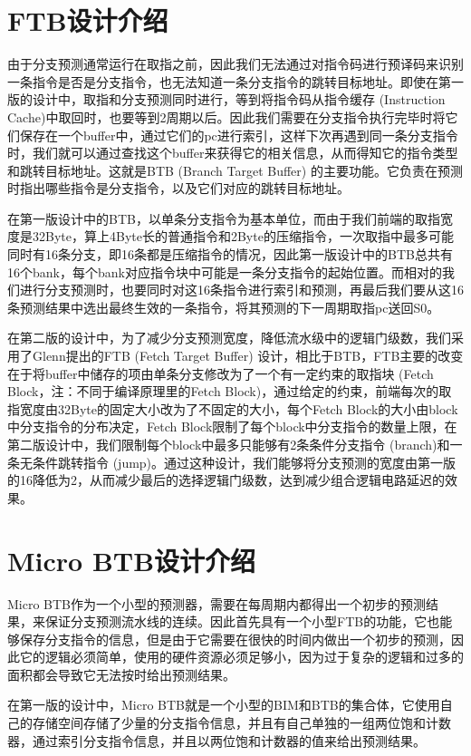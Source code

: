 \section{FTB设计介绍}

由于分支预测通常运行在取指之前，因此我们无法通过对指令码进行预译码来识别一条指令是否是分支指令，也无法知道一条分支指令的跳转目标地址。即使在第一版的设计中，取指和分支预测同时进行，等到将指令码从指令缓存 (Instruction Cache)中取回时，也要等到2周期以后。因此我们需要在分支指令执行完毕时将它们保存在一个buffer中，通过它们的pc进行索引，这样下次再遇到同一条分支指令时，我们就可以通过查找这个buffer来获得它的相关信息，从而得知它的指令类型和跳转目标地址。这就是BTB (Branch Target Buffer) 的主要功能。它负责在预测时指出哪些指令是分支指令，以及它们对应的跳转目标地址。

在第一版设计中的BTB，以单条分支指令为基本单位，而由于我们前端的取指宽度是32Byte，算上4Byte长的普通指令和2Byte的压缩指令，一次取指中最多可能同时有16条分支，即16条都是压缩指令的情况，因此第一版设计中的BTB总共有16个bank，每个bank对应指令块中可能是一条分支指令的起始位置。而相对的我们进行分支预测时，也要同时对这16条指令进行索引和预测，再最后我们要从这16条预测结果中选出最终生效的一条指令，将其预测的下一周期取指pc送回S0。

在第二版的设计中，为了减少分支预测宽度，降低流水级中的逻辑门级数，我们采用了Glenn提出的FTB (Fetch Target Buffer) 设计\cite{scalable-frontend}，相比于BTB，FTB主要的改变在于将buffer中储存的项由单条分支修改为了一个有一定约束的取指块 (Fetch Block，注：不同于编译原理里的Fetch Block)，通过给定的约束，前端每次的取指宽度由32Byte的固定大小改为了不固定的大小，每个Fetch Block的大小由block中分支指令的分布决定，Fetch Block限制了每个block中分支指令的数量上限，在第二版设计中，我们限制每个block中最多只能够有2条条件分支指令 (branch)和一条无条件跳转指令 (jump)。通过这种设计，我们能够将分支预测的宽度由第一版的16降低为2，从而减少最后的选择逻辑门级数，达到减少组合逻辑电路延迟的效果。

\section{Micro BTB设计介绍}

Micro BTB作为一个小型的预测器，需要在每周期内都得出一个初步的预测结果，来保证分支预测流水线的连续。因此首先具有一个小型FTB的功能，它也能够保存分支指令的信息，但是由于它需要在很快的时间内做出一个初步的预测，因此它的逻辑必须简单，使用的硬件资源必须足够小，因为过于复杂的逻辑和过多的面积都会导致它无法按时给出预测结果。

在第一版的设计中，Micro BTB就是一个小型的BIM和BTB的集合体，它使用自己的存储空间存储了少量的分支指令信息，并且有自己单独的一组两位饱和计数器，通过索引分支指令信息，并且以两位饱和计数器的值来给出预测结果。

